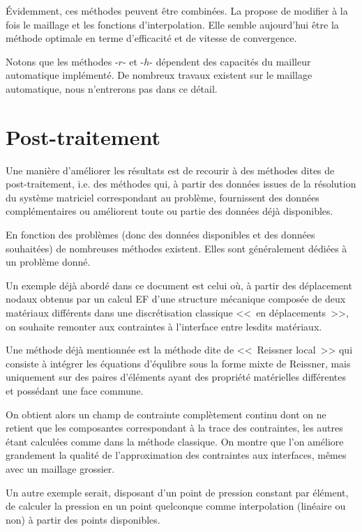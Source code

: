 \medskip
Évidemment, ces méthodes peuvent être combinées.
La  propose de modifier à la fois le maillage et
les fonctions d'interpolation. Elle semble aujourd'hui être la méthode optimale en terme
d'efficacité et de vitesse de convergence.

Notons que les méthodes -$r$- et -$h$- dépendent des capacités du mailleur automatique implémenté. De nombreux travaux existent sur le maillage automatique, nous n'entrerons pas dans ce détail.

\medskip
\section{Post-traitement}\label{Sec-PT}
Une manière d'améliorer les résultats est de recourir à des méthodes dites
de post-traitement, i.e. des méthodes qui, à partir des données issues de la
résolution du système matriciel correspondant au problème, fournissent
des données complémentaires ou améliorent toute ou partie des données
déjà disponibles.

En fonction des problèmes (donc des données disponibles et des données
souhaitées) de nombreuses méthodes existent. Elles sont généralement
dédiées à un problème donné.

\medskip
Un exemple déjà abordé dans ce document est celui où, à partir des déplacement
nodaux obtenus par un calcul EF d'une structure mécanique composée de deux matériaux
différents dans une discrétisation classique <<~en déplacements~>>, on souhaite remonter
aux contraintes à l'interface entre lesdits matériaux.

Une méthode déjà mentionnée est la méthode dite de <<~Reissner local~>>
qui consiste à intégrer les équations d'équlibre sous la forme mixte de Reissner,
mais uniquement sur des paires d'éléments ayant des propriété matérielles différentes
et possédant une face commune.

On obtient alors un champ de contrainte complètement continu dont on ne retient que
les composantes correspondant à la trace des contraintes, les autres étant calculées
comme dans la méthode classique. On montre que l'on améliore grandement la qualité
de l'approximation des contraintes aux interfaces, mêmes avec un maillage grossier.

\medskip
Un autre exemple serait, disposant d'un point de pression constant par élément, de
calculer la pression en un point quelconque comme interpolation (linéaire ou non) à
partir des points disponibles.

